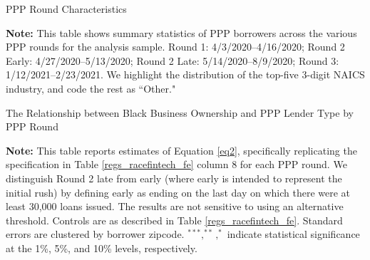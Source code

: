 \documentclass[11pt]{article}
\begin{document}
\newpage
\begin{table}[H]
	\caption{PPP Round Characteristics} \label{PPP_Round_Characteristics}
	\begin{adjustbox}{width=0.9\linewidth, center}
		
	\end{adjustbox}

	\begin{minipage}{\textwidth} \medskip
		\footnotesize{{\bf Note: }This table shows summary statistics of PPP borrowers across the various PPP rounds for the analysis sample. Round 1: 4/3/2020–4/16/2020; Round 2 Early: 4/27/2020–5/13/2020; Round 2 Late: 5/14/2020–8/9/2020;  Round 3: 1/12/2021–2/23/2021. We highlight the distribution of the top-five 3-digit NAICS industry, and code the rest as ``Other."}
	\end{minipage}
\end{table}



\newpage
\begin{table}[H]
	\caption{The Relationship between Black Business Ownership and PPP Lender Type by PPP Round} \label{table_f:round_nocontrols}
	\begin{center}
		
	\end{center}

	\begin{minipage}{\textwidth} \medskip
		\footnotesize{{\bf Note: }This table reports estimates of Equation \ref{eq2}, specifically replicating the specification in Table \ref{regs_racefintech_fe} column 8 for each PPP round. We distinguish Round 2 late from early (where early is intended to represent the initial rush) by defining early as ending on the last day on which there were at least 30,000 loans issued. The results are not sensitive to using an alternative threshold. Controls are as described in Table \ref{regs_racefintech_fe}. Standard errors are clustered by borrower zipcode. $^{***}, ^{**}, ^{*}$ indicate statistical significance at the 1\%, 5\%, and 10\% levels, respectively.}
	\end{minipage}
\end{table}
\end{document}
